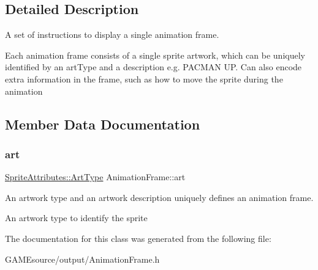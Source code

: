 \subsection{Detailed Description}
A set of instructions to display a single animation frame. 

Each animation frame consists of a single sprite artwork, which can be uniquely identified by an art\+Type and a description e.\+g. P\+A\+C\+M\+AN UP. Can also encode extra information in the frame, such as how to move the sprite during the animation 

\subsection{Member Data Documentation}
\mbox{\label{class_animation_frame_a53f604dd1cb7006607cf5133198baaaa}} 
\subsubsection{\texorpdfstring{art}{art}}
{\footnotesize\ttfamily \mbox{\hyperlink{namespace_sprite_attributes_afb5447c311bc29f0ce8ddfd025c6e998}{Sprite\+Attributes\+::\+Art\+Type}} Animation\+Frame\+::art}



An artwork type and an artwork description uniquely defines an animation frame. 

An artwork type to identify the sprite 

The documentation for this class was generated from the following file\+:\begin{DoxyCompactItemize}
\item 
G\+A\+M\+Esource/output/Animation\+Frame.\+h\end{DoxyCompactItemize}
